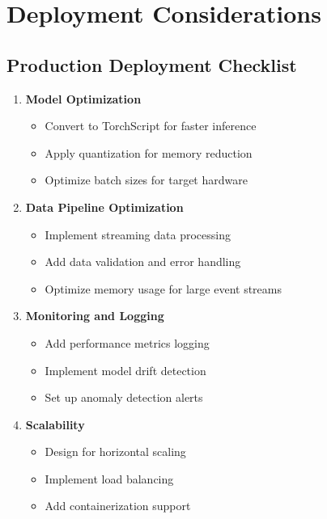 \documentclass[12pt,a4paper]{article}
\begin{document}
\section{Deployment Considerations}

\subsection{Production Deployment Checklist}

\begin{enumerate}
    \item \textbf{Model Optimization}
    \begin{itemize}
        \item Convert to TorchScript for faster inference
        \item Apply quantization for memory reduction
        \item Optimize batch sizes for target hardware
    \end{itemize}

    \item \textbf{Data Pipeline Optimization}
    \begin{itemize}
        \item Implement streaming data processing
        \item Add data validation and error handling
        \item Optimize memory usage for large event streams
    \end{itemize}

    \item \textbf{Monitoring and Logging}
    \begin{itemize}
        \item Add performance metrics logging
        \item Implement model drift detection
        \item Set up anomaly detection alerts
    \end{itemize}

    \item \textbf{Scalability}
    \begin{itemize}
        \item Design for horizontal scaling
        \item Implement load balancing
        \item Add containerization support
    \end{itemize}
\end{enumerate}
\end{document}
